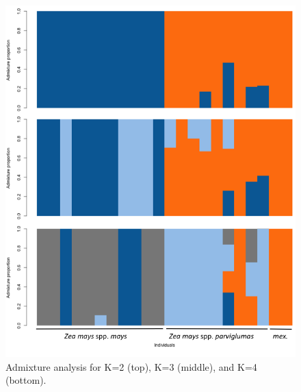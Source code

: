 \begin{figure}
\centering
\includegraphics[width=\linewidth]{figures/admixture.png}
\caption{Admixture analysis for K=2 (top), K=3 (middle), and K=4 (bottom).}
\label{fig:suppadmix}
\end{figure}

